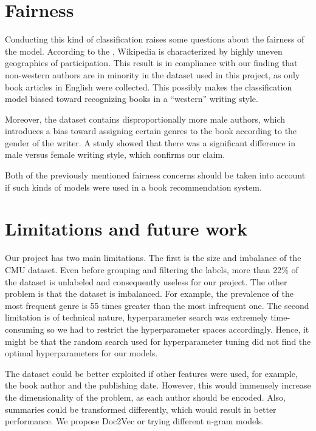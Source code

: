 \documentclass{article}
\begin{document}
\section{Fairness}
\par Conducting this kind of classification raises some questions about the fairness of the model. 
According to the \cite{graham2015digital}, Wikipedia is characterized by highly uneven geographies of participation. This result is in compliance with our finding that non-western authors are in minority in the dataset used in this project, as only book articles in English were collected. This possibly makes the classification model biased toward recognizing books in a “western” writing style.
\par Moreover, the dataset contains disproportionally more male authors, which introduces a bias toward assigning certain genres to the book according to the gender of the writer. A study \cite{argamon2003gender} showed that there was a significant difference in male versus female writing style, which confirms our claim. 
\par Both of the previously mentioned fairness concerns should be taken into account if such kinds of models were used in a book recommendation system.

\section{Limitations and future work}
\par Our project has two main limitations. The first is the size and imbalance of the CMU dataset. Even before grouping and filtering the labels, more than 22\% of the dataset is unlabeled and consequently useless for our project. The other problem is that the dataset is imbalanced. For example, the prevalence of the most frequent genre is 55 times greater than the most infrequent one. The second limitation is of technical nature, hyperparameter search was extremely time-consuming so we had to restrict the hyperparameter spaces accordingly. Hence, it might be that the random search used for hyperparameter tuning did not find the optimal hyperparameters for our models.
\par The dataset could be better exploited if other features were used, for example, the book author and the publishing date. However, this would immensely increase the dimensionality of the problem, as each author should be encoded. Also, summaries could be transformed differently, which would result in better performance. We propose Doc2Vec\cite{le2014distributed} or trying different n-gram models. 
\end{document}
